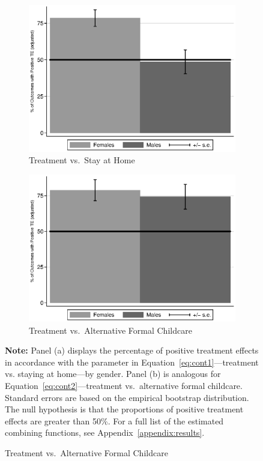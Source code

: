 \begin{figure}[!htbp]
\centering
\caption{Positively Impacted Outcomes, ABC/CARE Males and Females}\label{fig:ppositive}
\begin{subfigure}[h]{0.5\textwidth}
		\centering
		\caption{ Treatment vs.\ Stay at Home} \label{fig:ppositivehome}
		\includegraphics[width=\textwidth]{output/epan_ipw_p0_all.eps}
\end{subfigure}%
\begin{subfigure}[h]{0.5\textwidth}
	\centering
	\caption{Treatment vs.\ Alternative Formal Childcare} \label{fig:ppositivealternative}
		\includegraphics[width=\textwidth]{output/epan_ipw_p1_all.eps}
\end{subfigure}
\footnotesize \justify
\textbf{Note:} Panel (a) displays the percentage of positive treatment effects in accordance with the parameter in Equation~\eqref{eq:cont1}---treatment vs. staying at home---by gender. Panel (b) is analogous for Equation~\eqref{eq:cont2}---treatment vs.\ alternative formal childcare. Standard errors are based on the empirical bootstrap distribution. The null hypothesis is that the proportions of positive treatment effects are greater than 50\%. For a full list of the estimated combining functions, see Appendix~\ref{appendix:results}. \\
\end{figure}

